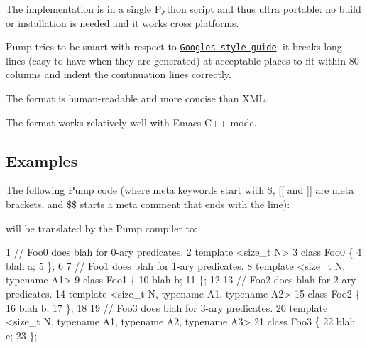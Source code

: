 \begin{DoxyItemize}
\item The implementation is in a single Python script and thus ultra portable\+: no build or installation is needed and it works cross platforms.
\item Pump tries to be smart with respect to \href{http://code.google.com/p/google-styleguide/}{\tt Google\textquotesingle{}s style guide}\+: it breaks long lines (easy to have when they are generated) at acceptable places to fit within 80 columns and indent the continuation lines correctly.
\item The format is human-\/readable and more concise than X\+ML.
\item The format works relatively well with Emacs\textquotesingle{} C++ mode.
\end{DoxyItemize}

\subsection*{Examples}

The following Pump code (where meta keywords start with {\ttfamily \$}, {\ttfamily \mbox{[}\mbox{[}} and {\ttfamily \mbox{]}\mbox{]}} are meta brackets, and {\ttfamily \$\$} starts a meta comment that ends with the line)\+:




will be translated by the Pump compiler to\+:


\begin{DoxyCode}
1 // Foo0 does blah for 0-ary predicates.
2 template <size\_t N>
3 class Foo0 \{
4   blah a;
5 \};
6 
7 // Foo1 does blah for 1-ary predicates.
8 template <size\_t N, typename A1>
9 class Foo1 \{
10   blah b;
11 \};
12 
13 // Foo2 does blah for 2-ary predicates.
14 template <size\_t N, typename A1, typename A2>
15 class Foo2 \{
16   blah b;
17 \};
18 
19 // Foo3 does blah for 3-ary predicates.
20 template <size\_t N, typename A1, typename A2, typename A3>
21 class Foo3 \{
22   blah c;
23 \};
\end{DoxyCode}


